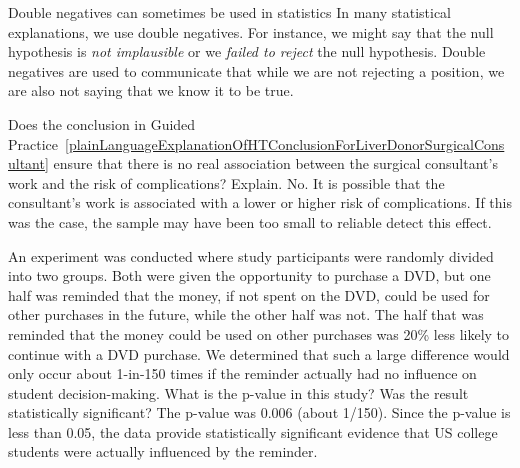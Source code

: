 \begin{onebox}{Double negatives can sometimes be used in statistics}
In many statistical explanations, we use double negatives. For instance, we might say that the null hypothesis is \emph{not implausible} or we \emph{failed to reject} the null hypothesis. Double negatives are used to communicate that while we are not rejecting a position, we are also not saying that we know it to be true.\end{onebox}

\begin{examplewrap}
\begin{nexample}{Does the conclusion in Guided Practice~\ref{plainLanguageExplanationOfHTConclusionForLiverDonorSurgicalConsultant} ensure that there is no real association between the surgical consultant's work and the risk of complications? Explain.}
No. It is possible that the consultant's work is associated with a lower or higher risk of complications.
If this was the case, the sample may have been too small
to reliable detect this effect.
\end{nexample}
\end{examplewrap}




\begin{examplewrap}
\begin{nexample}{An experiment was conducted where study participants were randomly divided into two groups. Both were given the opportunity to purchase a DVD, but one half was reminded that the money, if not spent on the DVD, could be used for other purchases in the future, while the other half was not. The half that was reminded that the money could be used on other purchases was 20\% less likely to continue with a DVD purchase. We determined that such a large difference would only occur about 1-in-150 times if the reminder actually had no influence on student decision-making. What is the p-value in this study? Was the result statistically significant?}
The p-value was 0.006 (about 1/150). Since the p-value is less than 0.05, the data provide statistically significant evidence that US college students were actually influenced by the reminder.
\end{nexample}
\end{examplewrap}

